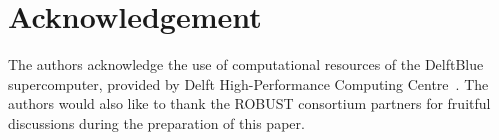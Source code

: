
\section{Acknowledgement}
The authors acknowledge the use of computational resources of the DelftBlue supercomputer, provided by Delft High-Performance Computing Centre~\cite{DHPC2022}. The authors would also like to thank the ROBUST consortium partners for fruitful discussions during the preparation of this paper.